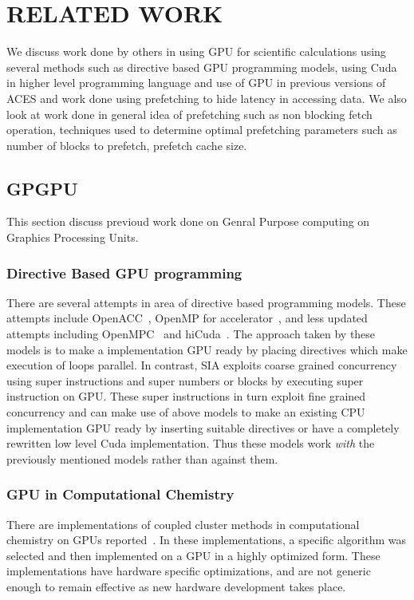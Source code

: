\chapter{RELATED WORK}\label{lit}

We discuss work done by others in using GPU for scientific calculations using
several methods such as directive based GPU programming models, using Cuda in
higher level programming language and use of GPU in previous versions of ACES
and work done using prefetching to hide latency in accessing data. We also look
at work done in general idea of prefetching such as non blocking fetch operation,
techniques used to determine optimal prefetching parameters such as number of
blocks to prefetch, prefetch cache size.

\section{GPGPU}
This section discuss previoud work done on Genral Purpose computing on Graphics
Processing Units.

\subsection{Directive Based GPU programming}
There are several attempts in area of directive based programming models. These
attempts include OpenACC~\cite{openacc}, OpenMP for
accelerator~\cite{openmpforaccelerators}, and less updated attempts including
OpenMPC~\cite{openmpc} and hiCuda~\cite{hicuda}. The approach taken by these models
is to make a implementation GPU ready by placing directives which make
execution of loops parallel. In contrast, SIA exploits coarse grained
concurrency using super instructions and super numbers or blocks by executing
super instruction on GPU. These super instructions in turn exploit fine grained
concurrency and can make use of above models to make an existing CPU implementation
GPU ready by inserting suitable directives or have a completely rewritten low level
Cuda implementation. Thus these models work \textit{with} the previously mentioned
models rather than against them.

\subsection{GPU in Computational Chemistry}
There are implementations of coupled cluster methods in computational chemistry
on GPUs reported~\cite{bhaskar2013}\cite{deprince2011}\cite{maw2011}. In these
implementations, a specific algorithm was selected and then implemented on a
GPU in a highly optimized form. These implementations have hardware specific
optimizations, and are not generic enough to remain effective as new hardware
development takes place.

